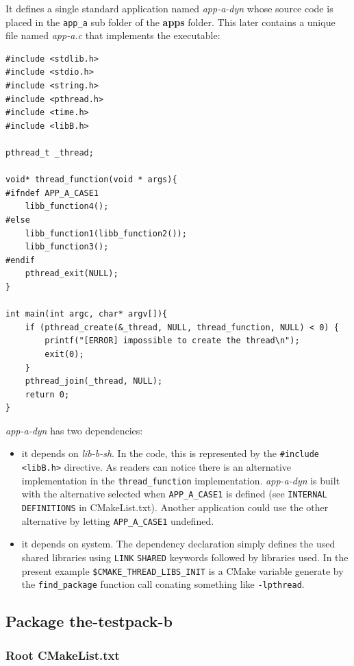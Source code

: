 \documentclass[12pt,a4paper]{article}
\begin{document}
It defines a single standard application named \textit{app-a-dyn} whose source code is placed in the \texttt{app\_a} sub folder of the \textbf{apps} folder. This later contains a unique file named \textit{app-a.c} that implements the executable:
\begin{verbatim}
#include <stdlib.h>
#include <stdio.h>
#include <string.h>
#include <pthread.h>
#include <time.h>
#include <libB.h>

pthread_t _thread;

void* thread_function(void * args){
#ifndef APP_A_CASE1
	libb_function4();
#else
	libb_function1(libb_function2());
	libb_function3();
#endif
	pthread_exit(NULL);
}

int main(int argc, char* argv[]){
	if (pthread_create(&_thread, NULL, thread_function, NULL) < 0) {
		printf("[ERROR] impossible to create the thread\n");
		exit(0);
	}
	pthread_join(_thread, NULL);
	return 0;	
}
\end{verbatim} 

\textit{app-a-dyn} has two dependencies:
\begin{itemize}
\item it depends on \textit{lib-b-sh}. In the code, this is represented by the \texttt{\#include <libB.h>} directive. As readers can notice there is an alternative implementation in the  \texttt{thread\_function} implementation. \textit{app-a-dyn} is built with the alternative selected when \texttt{APP\_A\_CASE1} is defined (see \texttt{INTERNAL} \texttt{DEFINITIONS} in CMakeList.txt). Another application could use the other alternative by letting \texttt{APP\_A\_CASE1} undefined.
\item it depends on system. The dependency declaration simply defines the used shared libraries using \texttt{LINK} \texttt{SHARED} keywords followed by libraries used. In the present example \texttt{\${CMAKE\_THREAD\_LIBS\_INIT}} is a CMake variable generate by the \texttt{find\_package} function call conating something like \texttt{-lpthread}.
\end{itemize}

\subsection{Package the-testpack-b}

\subsubsection{Root CMakeList.txt}
\end{document}
